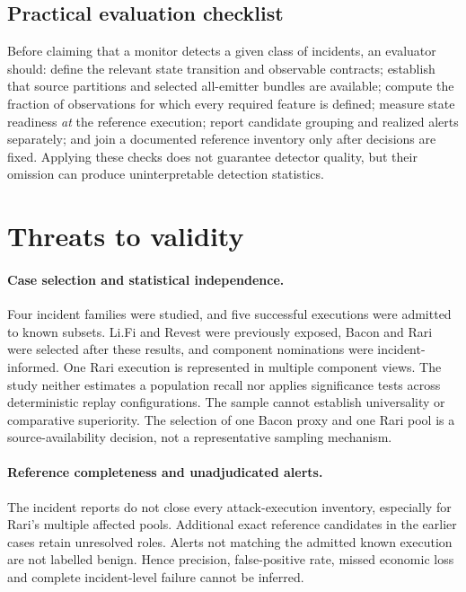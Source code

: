 \documentclass[preprint,12pt,authoryear]{elsarticle}
\begin{document}
\subsection{Practical evaluation checklist}
Before claiming that a monitor detects a given class of incidents, an evaluator should: define the relevant state transition and observable contracts; establish that source partitions and selected all-emitter bundles are available; compute the fraction of observations for which every required feature is defined; measure state readiness \emph{at} the reference execution; report candidate grouping and realized alerts separately; and join a documented reference inventory only after decisions are fixed. Applying these checks does not guarantee detector quality, but their omission can produce uninterpretable detection statistics.

\section{Threats to validity}\label{sec:validity}

\paragraph{Case selection and statistical independence.} Four incident families were studied, and five successful executions were admitted to known subsets. Li.Fi and Revest were previously exposed, Bacon and Rari were selected after these results, and component nominations were incident-informed. One Rari execution is represented in multiple component views. The study neither estimates a population recall nor applies significance tests across deterministic replay configurations. The sample cannot establish universality or comparative superiority. The selection of one Bacon proxy and one Rari pool is a source-availability decision, not a representative sampling mechanism.

\paragraph{Reference completeness and unadjudicated alerts.} The incident reports do not close every attack-execution inventory, especially for Rari's multiple affected pools. Additional exact reference candidates in the earlier cases retain unresolved roles. Alerts not matching the admitted known execution are not labelled benign. Hence precision, false-positive rate, missed economic loss and complete incident-level failure cannot be inferred.
\end{document}
